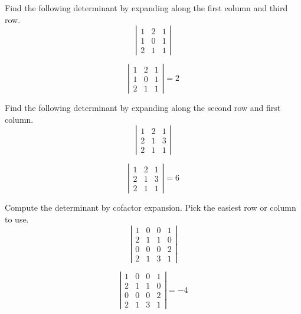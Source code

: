 \documentclass{ximera}
\begin{document}
\begin{problem}\label{prb:7.5} Find the following determinant by expanding along the first column and
third row.
\begin{equation*}
\left|
\begin{array}{rrr}
1 & 2 & 1 \\
1 & 0 & 1 \\
2 & 1 & 1
\end{array}
\right|
\end{equation*}
\begin{hint}
\[
\left|
\begin{array}{ccc}
1 & 2 & 1 \\
1 & 0 & 1 \\
2 & 1 & 1
\end{array}
\right| =  2
\]
\end{hint}
\end{problem}

\begin{problem}\label{prb:7.6} Find the following determinant by expanding along the second row and
first column.
\begin{equation*}
\left|
\begin{array}{rrr}
1 & 2 & 1 \\
2 & 1 & 3 \\
2 & 1 & 1
\end{array}
\right|
\end{equation*}
\begin{hint}
\[
\left|
\begin{array}{ccc}
1 & 2 & 1 \\
2 & 1 & 3 \\
2 & 1 & 1
\end{array}
\right| = 6
\]
\end{hint}
\end{problem}

\begin{problem}\label{prb:7.7} Compute the determinant by cofactor expansion. Pick the easiest row or
column to use.
\begin{equation*}
\left|
\begin{array}{rrrr}
1 & 0 & 0 & 1 \\
2 & 1 & 1 & 0 \\
0 & 0 & 0 & 2 \\
2 & 1 & 3 & 1
\end{array}
\right|
\end{equation*}
\begin{hint}
\[
\left|
\begin{array}{cccc}
1 & 0 & 0 & 1 \\
2 & 1 & 1 & 0 \\
0 & 0 & 0 & 2 \\
2 & 1 & 3 & 1
\end{array}
\right| = -4
\]
\end{hint}
\end{problem}
\end{document}
